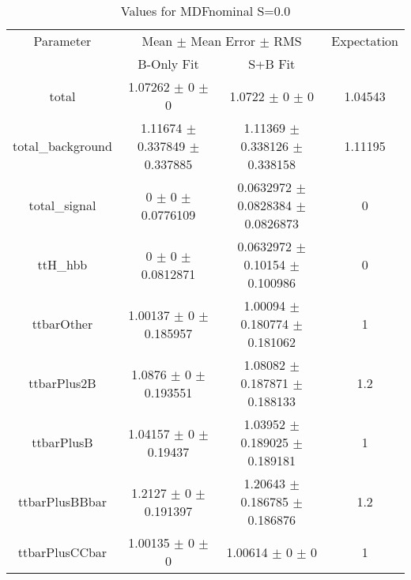 \begin{table}
\centering
\caption{Values for MDFnominal S=0.0}
\begin{tabular}{cccc}
\toprule
Parameter & \multicolumn{2}{c}{Mean $\pm$ Mean Error $\pm$ RMS} & Expectation\\
 & B-Only Fit & S+B Fit & \\
\midrule
total & \num{1.07262} $\pm$ \num{0} $\pm$ \num{0} & \num{1.0722} $\pm$ \num{0} $\pm$ \num{0} & \num{1.04543}\\
total\_background & \num{1.11674} $\pm$ \num{0.337849} $\pm$ \num{0.337885} & \num{1.11369} $\pm$ \num{0.338126} $\pm$ \num{0.338158} & \num{1.11195}\\
total\_signal & \num{0} $\pm$ \num{0} $\pm$ \num{0.0776109} & \num{0.0632972} $\pm$ \num{0.0828384} $\pm$ \num{0.0826873} & \num{0}\\
ttH\_hbb & \num{0} $\pm$ \num{0} $\pm$ \num{0.0812871} & \num{0.0632972} $\pm$ \num{0.10154} $\pm$ \num{0.100986} & \num{0}\\
ttbarOther & \num{1.00137} $\pm$ \num{0} $\pm$ \num{0.185957} & \num{1.00094} $\pm$ \num{0.180774} $\pm$ \num{0.181062} & \num{1}\\
ttbarPlus2B & \num{1.0876} $\pm$ \num{0} $\pm$ \num{0.193551} & \num{1.08082} $\pm$ \num{0.187871} $\pm$ \num{0.188133} & \num{1.2}\\
ttbarPlusB & \num{1.04157} $\pm$ \num{0} $\pm$ \num{0.19437} & \num{1.03952} $\pm$ \num{0.189025} $\pm$ \num{0.189181} & \num{1}\\
ttbarPlusBBbar & \num{1.2127} $\pm$ \num{0} $\pm$ \num{0.191397} & \num{1.20643} $\pm$ \num{0.186785} $\pm$ \num{0.186876} & \num{1.2}\\
ttbarPlusCCbar & \num{1.00135} $\pm$ \num{0} $\pm$ \num{0} & \num{1.00614} $\pm$ \num{0} $\pm$ \num{0} & \num{1}\\
\bottomrule
\end{tabular}
\end{table}